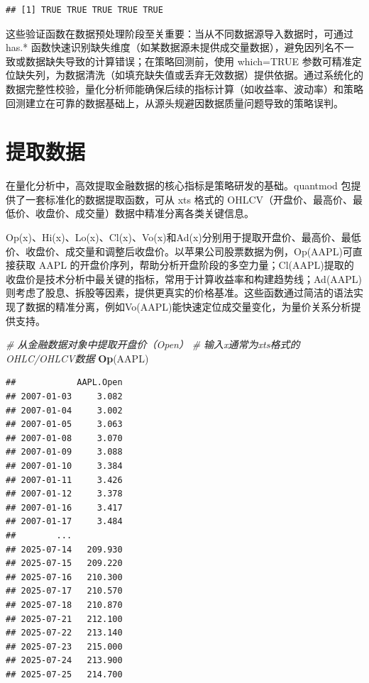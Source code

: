\documentclass[]{ctexbook}
\newenvironment{Shaded}{\begin{snugshade}}{\end{snugshade}}
\newcommand{\CommentTok}[1]{\textcolor[rgb]{0.56,0.35,0.01}{\textit{#1}}}
\newcommand{\FunctionTok}[1]{\textcolor[rgb]{0.13,0.29,0.53}{\textbf{#1}}}
\newcommand{\NormalTok}[1]{#1}
\begin{document}
\begin{verbatim}
## [1] TRUE TRUE TRUE TRUE TRUE
\end{verbatim}

这些验证函数在数据预处理阶段至关重要：当从不同数据源导入数据时，可通过 has.* 函数快速识别缺失维度（如某数据源未提供成交量数据），避免因列名不一致或数据缺失导致的计算错误；在策略回测前，使用 which=TRUE 参数可精准定位缺失列，为数据清洗（如填充缺失值或丢弃无效数据）提供依据。通过系统化的数据完整性校验，量化分析师能确保后续的指标计算（如收益率、波动率）和策略回测建立在可靠的数据基础上，从源头规避因数据质量问题导致的策略误判。

\section{提取数据}\label{ux63d0ux53d6ux6570ux636e}

在量化分析中，高效提取金融数据的核心指标是策略研发的基础。quantmod 包提供了一套标准化的数据提取函数，可从 xts 格式的 OHLCV（开盘价、最高价、最低价、收盘价、成交量）数据中精准分离各类关键信息。

Op(x)、Hi(x)、Lo(x)、Cl(x)、Vo(x)和Ad(x)分别用于提取开盘价、最高价、最低价、收盘价、成交量和调整后收盘价。以苹果公司股票数据为例，Op(AAPL)可直接获取 AAPL 的开盘价序列，帮助分析开盘阶段的多空力量；Cl(AAPL)提取的收盘价是技术分析中最关键的指标，常用于计算收益率和构建趋势线；Ad(AAPL)则考虑了股息、拆股等因素，提供更真实的价格基准。这些函数通过简洁的语法实现了数据的精准分离，例如Vo(AAPL)能快速定位成交量变化，为量价关系分析提供支持。

\begin{Shaded}
\begin{Highlighting}[]
\CommentTok{\# 从金融数据对象中提取开盘价（Open）}
\CommentTok{\# 输入x通常为xts格式的OHLC/OHLCV数据}
\FunctionTok{Op}\NormalTok{(AAPL)}
\end{Highlighting}
\end{Shaded}

\begin{verbatim}
##            AAPL.Open
## 2007-01-03     3.082
## 2007-01-04     3.002
## 2007-01-05     3.063
## 2007-01-08     3.070
## 2007-01-09     3.088
## 2007-01-10     3.384
## 2007-01-11     3.426
## 2007-01-12     3.378
## 2007-01-16     3.417
## 2007-01-17     3.484
##        ...          
## 2025-07-14   209.930
## 2025-07-15   209.220
## 2025-07-16   210.300
## 2025-07-17   210.570
## 2025-07-18   210.870
## 2025-07-21   212.100
## 2025-07-22   213.140
## 2025-07-23   215.000
## 2025-07-24   213.900
## 2025-07-25   214.700
\end{verbatim}
\end{document}

